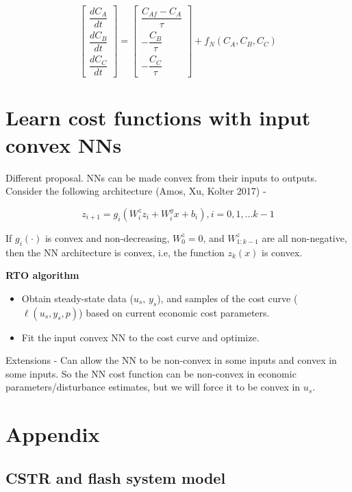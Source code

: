 \documentclass[10pt]{article}
\begin{document}
\begin{equation*}
\begin{bmatrix}
\dfrac{dC_A}{dt} \\
\dfrac{dC_B}{dt} \\
\dfrac{dC_C}{dt}
\end{bmatrix} = \begin{bmatrix}
\dfrac{C_{Af} - C_A}{\tau} \\
- \dfrac{C_B}{\tau} \\
- \dfrac{C_C}{\tau}
\end{bmatrix} + f_N(C_A, C_B, C_C)
\end{equation*}

\section{Learn cost functions with input convex NNs}
Different proposal. NNs can be made convex from their inputs to outputs. 
Consider the following architecture (Amos, Xu, Kolter 2017) - 

\begin{equation*}
	z_{i+1} = g_i(W_i^{z}z_{i} + W_i^{y}x + b_i), i=0, 1, ...k-1
\end{equation*}

If $g_i(\cdot)$ is convex and non-decreasing, $W_0^{z} = 0$, and $W_{1:k-1}^{z}$
are all non-negative, then the NN architecture is convex, i.e, the function 
$z_k(x)$ is convex.

\textbf{RTO algorithm}
\begin{itemize}
	\item Obtain steady-state data ($u_s$, $y_s$), and samples of the cost 
	curve ($\ell(u_s, y_s, p)$) based on current economic cost parameters.
	\item Fit the input convex NN to the cost curve and optimize.
\end{itemize}

Extensions - Can allow the NN to be non-convex in some inputs and convex in 
some inputs. So the NN cost function can be non-convex in economic 
parameters/disturbance estimates, but we will force it to be convex in $u_s$.

\section*{Appendix} 
\renewcommand{\thesubsection}{\Alph{subsection}}

\subsection{CSTR and flash system model} \label{app:cstr_flash}
\end{document}
